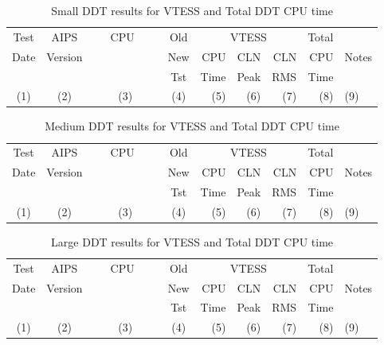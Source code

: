\begin{table}[h]
\begin{center}
\begin{tabular}{cccc|rrr|rl}
\hline \hline
Test      &  AIPS    &~~~CPU~~~~& Old  &  \multicolumn{3}{c|}{VTESS}& Total & \\
  Date    & Version  &          & New  &   CPU    &    CLN    &    CLN    &     CPU     &   Notes           \\
          &          &          & Tst  &  Time    &   Peak    &    RMS    &    Time     &                   \\
  (1)     &   (2)    &  (3)     & (4)  & (5)      &   (6)     &   (7)     &   (8)      &    (9)  \\
\hline  \hline \hline
\end{tabular}
\end{center}
\caption{Small DDT results for VTESS and Total DDT CPU time}
\end{table}

\clearpage

\begin{table}[h]
\begin{center}
\begin{tabular}{cccc|rrr|rl}
\hline \hline
Test      &  AIPS    &~~~CPU~~~~& Old  &  \multicolumn{3}{c|}{VTESS}& Total & \\
  Date    & Version  &          & New  &   CPU    &    CLN    &    CLN    &     CPU     &   Notes           \\
          &          &          & Tst  &  Time    &   Peak    &    RMS    &    Time     &                   \\
  (1)     &   (2)    &  (3)     & (4)  & (5)      &   (6)     &   (7)     &   (8)      &    (9)  \\
\hline
 \hline \hline
\end{tabular}
\end{center}
\caption{Medium DDT results for VTESS and Total DDT CPU time}
\end{table}

\begin{table}[h]
\begin{center}
\begin{tabular}{cccc|rrr|rl}
\hline \hline
Test      &  AIPS    &~~~CPU~~~~& Old  &  \multicolumn{3}{c|}{VTESS}& Total & \\
  Date    & Version  &          & New  &   CPU    &    CLN    &    CLN    &     CPU     &   Notes           \\
          &          &          & Tst  &  Time    &   Peak    &    RMS    &    Time     &                   \\
  (1)     &   (2)    &  (3)     & (4)  & (5)      &   (6)     &   (7)     &   (8)      &    (9)  \\
\hline

\hline \hline
\end{tabular}
\end{center}
\caption{Large DDT results for VTESS and Total DDT CPU time}
\end{table}


